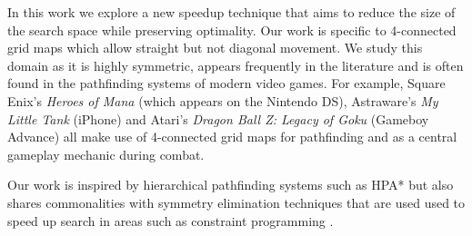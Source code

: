 In this work we explore a new speedup technique that aims to reduce the size of the search 
space while preserving optimality.
Our work is specific to 4-connected grid maps which allow straight but not diagonal movement.
We study this domain as it is highly symmetric, appears frequently in the literature 
\cite{yap,swamps,far} and is often found in the pathfinding systems of modern video games.
For example, Square Enix's \emph{Heroes of Mana} (which appears on the Nintendo DS),
Astraware's \emph{My Little Tank} (iPhone) and Atari's \emph{Dragon Ball Z: Legacy of Goku} 
(Gameboy Advance) all make use of 4-connected grid maps for pathfinding and as a central
gameplay mechanic during combat.
\par

Our work is inspired by hierarchical pathfinding systems such as HPA* \cite{botea04} but also shares
commonalities with symmetry elimination techniques that are used used to speed up search in areas 
such as constraint programming \cite{walsh}.




\par

